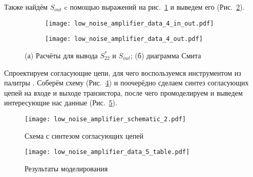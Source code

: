 Также найдём $S_{out}$ c помощью выражений на рис.~\ref{fig:low_noise_amplifier_data_4_in_out} и выведем его (Рис.~\ref{fig:low_noise_amplifier_data_4_out}).

\begin{figure}[!ht]
    \centering
    \begin{subfigure}[b]{0.7\textwidth}
        \centering
        \texttt{[image: low\_noise\_amplifier\_data\_4\_in\_out.pdf]}
        \caption{}%
        \label{fig:low_noise_amplifier_data_4_in_out}
    \end{subfigure}
    \hfill
    \begin{subfigure}[b]{0.3\textwidth}
        \centering
        \texttt{[image: low\_noise\_amplifier\_data\_4\_out.pdf]}
        \caption{}%
        \label{fig:low_noise_amplifier_data_4_out}
    \end{subfigure}
    \caption{%
        (а) Расчёты для вывода $S_{22}^*$ и $S_{out}$;
        (б) диаграмма Смита
    }%
    \label{fig:low_noise_amplifier_data_4_2}
\end{figure}

Спроектируем согласующие цепи, для чего воспользуемся инструментом  из палитры .
Соберём схему (Рис.~\ref{fig:low_noise_amplifier_schematic_2}) и поочерёдно сделаем синтез согласующих цепей на входе и выходе транзистора, после чего промоделируем и выведем интересующие нас данные (Рис.~\ref{fig:low_noise_amplifier_data_5_table}).

\begin{figure}[!ht]
    \centering
    \texttt{[image: low\_noise\_amplifier\_schematic\_2.pdf]}
    \caption{Схема с синтезом согласующих цепей}%
    \label{fig:low_noise_amplifier_schematic_2}
\end{figure}

\begin{figure}[!ht]
    \centering
    \texttt{[image: low\_noise\_amplifier\_data\_5\_table.pdf]}
    \caption{Результаты моделирования}%
    \label{fig:low_noise_amplifier_data_5_table}
\end{figure}
